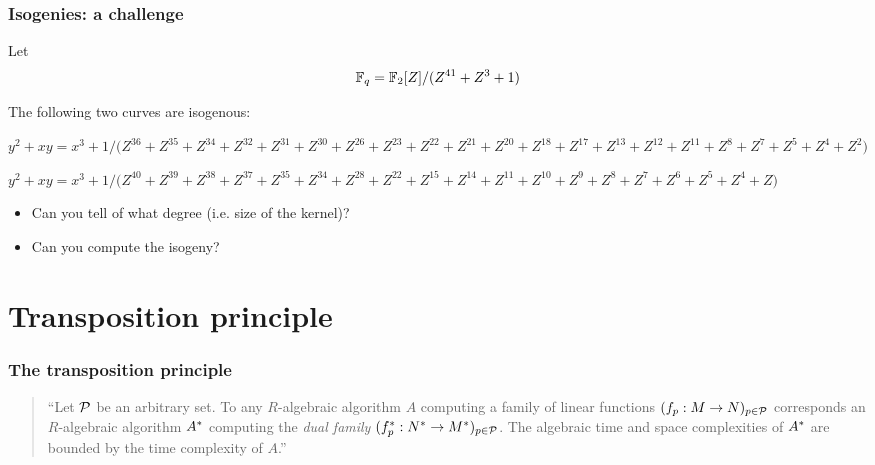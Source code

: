 \documentclass[10pt]{beamer}
\begin{document}
\begin{frame}
  \frametitle{Isogenies: a challenge}
  Let
  \[\mathbb{F}_q = \mathbb{F}_2[Z]/(Z^{41} + Z^3 + 1)\]

  The following two curves are isogenous:
  
  \begin{block}{}
    ${y^2 + xy = x^3 + 1/(Z^{36}} + Z^{35} + Z^{34} + Z^{32} + Z^{31}
    + Z^{30} + Z^{26} + Z^{23} + Z^{22} + Z^{21} + Z^{20} + Z^{18} +
    Z^{17} + Z^{13} + Z^{12} + Z^{11} + Z^8 + Z^7 + Z^5 + Z^4 + Z^2)$
  \end{block}

  \begin{block}{}
    ${y^2 + xy = x^3 + 1/(Z^{40}} + Z^{39} + Z^{38} + Z^{37} + Z^{35}
    + Z^{34} + Z^{28} + Z^{22} + Z^{15} + Z^{14} + Z^{11} + Z^{10} +
    Z^9 + Z^8 + Z^7 + Z^6 + Z^5 + Z^4 + Z)$
  \end{block}
  
  \begin{itemize}
  \item Can you tell of what degree (i.e. size of the kernel)? 
  \item Can you compute the isogeny?
  \end{itemize}
\end{frame}


\section{Transposition principle}

\begin{frame}
  \frametitle{The transposition principle}

  \begin{quote}
    \large ``Let $\mathcal{P}$ be an arbitrary set. To any $R$-algebraic
    algorithm $A$ computing a family of linear functions $(f_p:M\rightarrow
    N)_{p\in\mathcal{P}}$ corresponds an $R$-algebraic algorithm
    $A^\ast$ computing the \emph{dual family}
    $(f^\ast_p:N^\ast\rightarrow M^\ast)_{p\in\mathcal{P}}$. The algebraic
    time and space complexities of $A^\ast$ are bounded by the time
    complexity of $A$.''
  \end{quote}
  
\end{frame}

\end{document}
